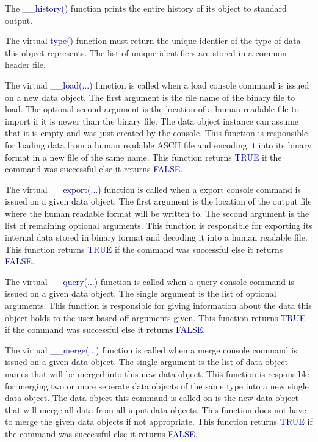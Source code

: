 \documentclass[10pt]{article}
\providecommand{\h}[1]{\textcolor{darkblue}{#1}}
\begin{document}
The \h{\_\_history()} function prints the entire history of its object to 
standard output.

The virtual \h{type()} function must return the unique identier of the type of 
data this object represents. The list of unique identifiers are stored in a 
common header file.

The virtual \h{\_\_load(...)} function is called when a load console command 
is issued on a new data object. The first argument is the file name of the 
binary file to load. The optional second argument is the location of a human 
readable file to import if it is newer than the binary file. The data object 
instance can assume that it is empty and was just created by the console. This 
function is responsible for loading data from a human readable ASCII file and 
encoding it into its binary format in a new file of the same name. This 
function returns \h{TRUE} if the command was successful else it returns 
\h{FALSE}.

The virtual \h{\_\_export(...)} function is called when a export console command 
is issued on a given data object. The first argument is the location of the 
output file where the human readable format will be written to. The second 
argument is the list of remaining optional arguments. This function is 
responsible for exporting its internal data stored in binary format and decoding 
it into a human readable file. This function returns \h{TRUE} if the command was 
successful else it returns \h{FALSE}.

The virtual \h{\_\_query(...)} function is called when a query console command 
is issued on a given data object. The single argument is the list of optional 
arguments. This function is responsible for giving information about the data 
this object holds to the user based off arguments given. This function returns 
\h{TRUE} if the command was successful else it returns \h{FALSE}.

The virtual \h{\_\_merge(...)} function is called when a merge console command 
is issued on a given data object. The single argument is the list of data 
object names that will be merged into this new data object. This function is 
responsible for merging two or more seperate data objects of the same type into 
a new single data object. The data object this command is called on is the new 
data object that will merge all data from all input data objects. This function 
does not have to merge the given data objects if not appropriate. This function 
returns \h{TRUE} if the command was successful else it returns \h{FALSE}.
\end{document}

